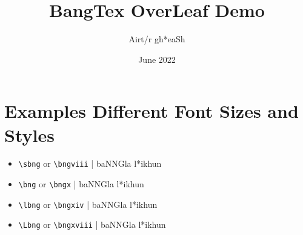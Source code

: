 \documentclass{article}
\title{BangTex OverLeaf Demo}
\author{{\lbng Airt/r \*gh*eaSh}}
\date{June 2022}
\begin{document}
\maketitle

\section{Examples Different Font Sizes and Styles}

\begin{itemize}

\item \verb+\sbng+ or \verb+\bngviii+ | {\sbng baNNGla \*l*ikhun}
\item \verb+\bng+ or \verb+\bngx+ | {\bng baNNGla \*l*ikhun}
\item \verb+\lbng+ or \verb+\bngxiv+ | {\lbng baNNGla \*l*ikhun}
\item \verb+\Lbng+ or \verb+\bngxviii+ | {\Lbng baNNGla \*l*ikhun}
 
\end{itemize}
\end{document}
